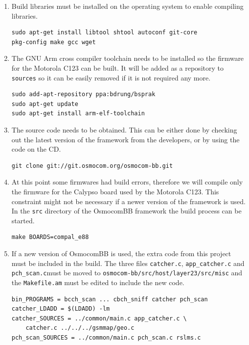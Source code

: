 \begin{enumerate}
	\item Build libraries must be installed on the operating system to enable compiling libraries.
\begin{verbatim}
sudo apt-get install libtool shtool autoconf git-core
pkg-config make gcc wget
\end{verbatim}
	\item The GNU Arm cross compiler toolchain needs to be installed so the firmware for the Motorola C123 can be built.
	It will be added as a repository to \texttt{sources} so it can be easily removed if it is not required any more.
	\begin{verbatim}
sudo add-apt-repository ppa:bdrung/bsprak
sudo apt-get update
sudo apt-get install arm-elf-toolchain
	\end{verbatim}
	\item The source code needs to be obtained.
	This can be either done by checking out the latest version of the framework from the developers, or by using the code on the CD.
\begin{verbatim}
git clone git://git.osmocom.org/osmocom-bb.git
\end{verbatim}
	\item At this point some firmwares had build errors, therefore we will compile only the firmware for the Calypso board used by the Motorola C123.
	This constraint might not be necessary if a newer version of the framework is used.
	In the \texttt{src} directory of the OsmocomBB framework the build process can be started.
	\begin{verbatim}
make BOARDS=compal_e88
	\end{verbatim}
	\item If a new version of OsmocomBB is used, the extra code from this project must be included in the build.
	The three files \texttt{catcher.c}, \texttt{app\_catcher.c} and \texttt{pch\_scan.c}must be moved to \texttt{osmocom-bb/src/host/layer23/src/misc} and the \texttt{Makefile.am} must be edited to include the new code.
	\begin{verbatim}
bin_PROGRAMS = bcch_scan ... cbch_sniff catcher pch_scan
catcher_LDADD = $(LDADD) -lm
catcher_SOURCES = ../common/main.c app_catcher.c \ 
	catcher.c ../../../gsmmap/geo.c
pch_scan_SOURCES = ../common/main.c pch_scan.c rslms.c
	\end{verbatim}
\end{enumerate}

